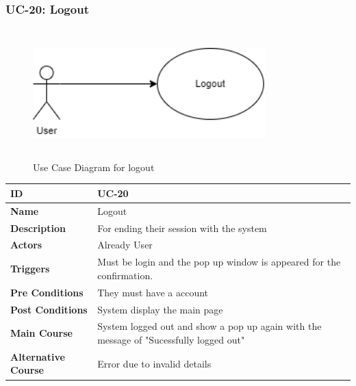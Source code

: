 \subsubsection{UC-20: Logout}
\begin{figure}[H]
    \includegraphics[height=5cm, width=0.8\textwidth]{./diagrams/Use Case/logout.png}
    \centering
    \caption{Use Case Diagram for logout}
    \label{Usecase1}
\end{figure}


\begin{center}
    \begin{tabularx}{\textwidth}{|l|X|}
        \hline
        \textbf{ID}                 & UC-20                                                                                  \\
        \hline
        \textbf{Name}               & Logout                                                                                 \\
        \hline
        \textbf{Description}        & For ending their session with the system                                               \\
        \hline
        \textbf{Actors}             & Already User                                                                           \\
        \hline
        \textbf{Triggers}           & Must be login and the pop up window is appeared for the confirmation.                  \\
        \hline
        \textbf{Pre Conditions}     & They must have a account                                                               \\
        \hline
        \textbf{Post Conditions}    & System display the main page                                                           \\
        \hline
        \textbf{Main Course}        & System logged out and show a pop up again with the message of "Sucessfully logged out" \\
        \hline
        \textbf{Alternative Course} & Error due to invalid details                                                           \\
        \hline
    \end{tabularx}
\end{center}
\newpage




